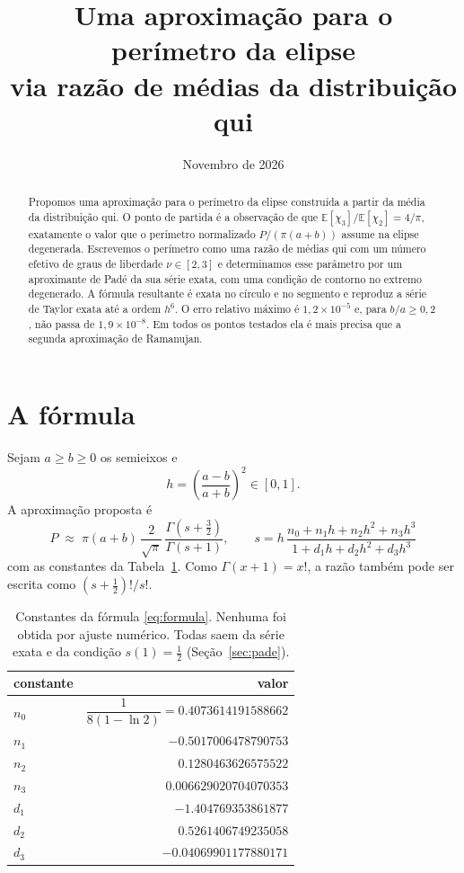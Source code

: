 \documentclass[11pt,a4paper]{article}
\title{Uma aproximação para o perímetro da elipse\\ via razão de médias da distribuição qui}
\author{}
\date{Novembro de 2026}
\theoremstyle{definition}
\theoremstyle{remark}
\newcommand{\E}{\mathbb{E}}
\begin{document}
\maketitle

\begin{abstract}
Propomos uma aproximação para o perímetro da elipse construída a partir da
média da distribuição qui. O ponto de partida é a observação de que
$\E[\chi_3]/\E[\chi_2] = 4/\pi$, exatamente o valor que o perímetro
normalizado $P/(\pi(a+b))$ assume na elipse degenerada. Escrevemos o perímetro
como uma razão de médias qui com um número efetivo de graus de liberdade
$\nu\in[2,3]$ e determinamos esse parâmetro por um aproximante de Padé da sua
série exata, com uma condição de contorno no extremo degenerado. A fórmula
resultante é exata no círculo e no segmento e reproduz a série de Taylor exata até
a ordem $h^6$. O erro relativo máximo é $1{,}2\times10^{-5}$ e, para $b/a\ge
0{,}2$, não passa de $1{,}9\times10^{-8}$. Em todos os pontos testados ela é
mais precisa que a segunda aproximação de Ramanujan.
\end{abstract}

\section{A fórmula}

Sejam $a\ge b\ge 0$ os semieixos e
\begin{equation}
  h=\left(\frac{a-b}{a+b}\right)^{2}\in[0,1].
\end{equation}
A aproximação proposta é
\begin{equation}\label{eq:formula}
  \boxed{\;P\;\approx\;\pi(a+b)\,\frac{2}{\sqrt{\pi}}\,
  \frac{\Gamma\!\left(s+\tfrac32\right)}{\Gamma(s+1)},
  \qquad
  s=h\,\frac{n_0+n_1h+n_2h^2+n_3h^3}{1+d_1h+d_2h^2+d_3h^3}\;}
\end{equation}
com as constantes da Tabela~\ref{tab:const}. Como $\Gamma(x+1)=x!$, a razão também pode ser escrita como $(s+\frac12)!/s!$.

\begin{table}[h]
\centering
\begin{tabular}{lr}
\toprule
constante & valor \\
\midrule
$n_0$ & $\dfrac{1}{8(1-\ln 2)} = 0.4073614191588662$\\[6pt]
$n_1$ & $-0.5017006478790753$\\
$n_2$ & $\phantom{-}0.1280463626575522$\\
$n_3$ & $\phantom{-}0.006629020704070353$\\
$d_1$ & $-1.404769353861877$\\
$d_2$ & $\phantom{-}0.5261406749235058$\\
$d_3$ & $-0.04069901177880171$\\
\bottomrule
\end{tabular}
\caption{Constantes da fórmula \eqref{eq:formula}. Nenhuma foi obtida por ajuste
numérico. Todas saem da série exata e da condição $s(1)=\tfrac12$ (Seção~\ref{sec:pade}).}
\label{tab:const}
\end{table}
\end{document}
